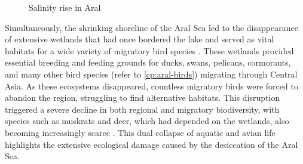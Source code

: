 \begin{figure}
    \centering
    \caption{Salinity rise in Aral}
    \label{fig:salinity-rise}
\end{figure}

Simultaneously, the shrinking shoreline of the Aral Sea led to the disappearance of extensive wetlands that had once bordered the lake and served as vital habitats for a wide variety of migratory bird species \autocite{joger2012fauna}. These wetlands provided essential breeding and feeding grounds for ducks, swans, pelicans, cormorants, and many other bird species (refer to \autoref{cp:aral-birds}) migrating through Central Asia. As these ecosystems disappeared, countless migratory birds were forced to abandon the region, struggling to find alternative habitats. This disruption triggered a severe decline in both regional and migratory biodiversity, with species such as muskrats and deer, which had depended on the wetlands, also becoming increasingly scarce \autocite{unesco2000vision}. This dual collapse of aquatic and avian life highlights the extensive ecological damage caused by the desiccation of the Aral Sea.

